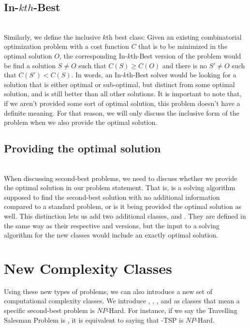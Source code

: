 \subsection{{In-$kth$-Best}}
\hfill\\
Similarly, we define the inclusive $k$th best class: Given an existing combinatorial optimization problem with a cost function $C$ that is to be minimized in the optimal solution $O$, the corresponding {In-$k$th-Best} version of the problem would be find a solution $S \neq O$ such that $C(S) \geq C(O)$ and there is no $S' \neq O$ such that $C(S') < C(S)$. In words, an {In-$k$th-Best} solver would be looking for a solution that is either optimal or sub-optimal, but distinct from some optimal solution, and is still better than all other solutions. It is important to note that, if we aren't provided some sort of optimal solution, this problem doesn't have a definite meaning. For that reason, we will only discuss the inclusive form of the problem when we also provide the optimal solution.
\subsection{Providing the optimal solution}
\hfill\\
When discussing second-best problems, we need to discuss whether we provide the optimal solution in our problem statement. That is, is a solving algorithm supposed to find the second-best solution with no additional information compared to a standard problem, or is it being provided the optimal solution as well. This distinction lets us add two additional classes, \exobk{} and \inobk. They are defined in the same way as their respective \exbk{} and \inbk{} versions, but the input to a solving algorithm for the new classes would include an exactly optimal solution.
\section{New Complexity Classes}
Using these new types of problems, we can also introduce a new set of computational complexity classes. We introduce \exbhk{}, \inbhk{}, \exobhk{}, and \inobhk{} as classes that mean a specific second-best problem is $NP$-Hard. For instance, if we say the Travelling Salesman Problem is \exobhk{}, it is equivalent to saying that \exobk{}-{TSP} is $NP$-Hard.
